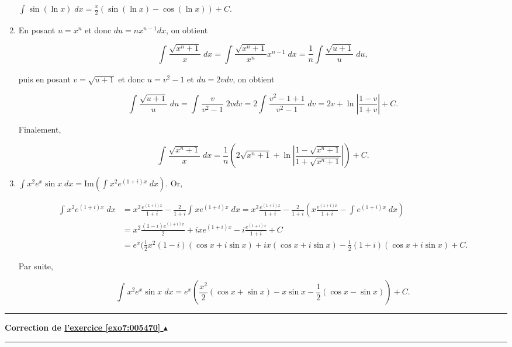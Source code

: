 \documentclass[11pt,a4paper]{article}
\newcounter{exo}
\newcommand{\correction}[1]{\hypertarget{cor7:#1}{}\label{cor7:#1}{\bf Correction de \hyperlink{exo7:#1}{l'exercice \ref{exo7:#1} $\blacktriangle$}}\vspace{1mm}\hrule\vspace{1mm}}
\newcommand{\fincorrection}{\vspace{1mm}\hrule\vspace*{7mm}}
\begin{document}
\begin{enumerate}
$\int_{}^{}\sin(\ln x)\;dx=\frac{x}{2}(\sin(\ln x)-\cos(\ln x))+C$.

\item En posant $u=x^n$ et donc $du=nx^{n-1}dx$, on obtient

$$\int_{}^{}\frac{\sqrt{x^n+1}}{x}\;dx=\int_{}^{}\frac{\sqrt{x^n+1}}{x^n}x^{n-1}\;dx=\frac{1}{n}\int_{}^{}\frac{\sqrt{u+1}}{u}\;du,$$

puis en posant $v=\sqrt{u+1}$ et donc $u=v^2-1$ et $du=2vdv$, on obtient

$$\int_{}^{}\frac{\sqrt{u+1}}{u}\;du=\int_{}^{}\frac{v}{v^2-1}\;2vdv=2\int_{}^{}\frac{v^2-1+1}{v^2-1}\;dv
=2v+\ln\left|\frac{1-v}{1+v}\right|+C.$$

Finalement,

$$\int_{}^{}\frac{\sqrt{x^n+1}}{x}\;dx=\frac{1}{n}(2\sqrt{x^n+1}+\ln\left|
\frac{1-\sqrt{x^n+1}}{1+\sqrt{x^n+1}}\right|)+C.$$

\item $\int_{}^{}x^2e^x\sin x\;dx=\mbox{Im}(\int_{}^{}x^2e^{(1+i)x}\;dx)$. Or,

\begin{align*}
\int_{}^{}x^2e^{(1+i)x}\;dx&=x^2\frac{e^{(1+i)x}}{1+i}-\frac{2}{1+i}\int_{}^{}xe^{(1+i)x}\;dx
=x^2\frac{e^{(1+i)x}}{1+i}-\frac{2}{1+i}(x\frac{e^{(1+i)x}}{1+i}-\int_{}^{}e^{(1+i)x}\;dx)\\
 &=x^2\frac{(1-i)e^{(1+i)x}}{2}+ixe^{(1+i)x}-i\frac{e^{(1+i)x}}{1+i}+C\\
 &=e^x(\frac{1}{2}x^2(1-i)(\cos x+i\sin x)+ix(\cos x+i\sin x)-\frac{1}{2}(1+i)(\cos x+i\sin x)+C.
\end{align*}

Par suite,

$$\int_{}^{}x^2e^x\sin x\;dx=e^x(\frac{x^2}{2}(\cos x+\sin x)-x\sin x-\frac{1}{2}(\cos x-\sin x))+C.$$

\end{enumerate}
\fincorrection
\correction{005470}
\end{document}
